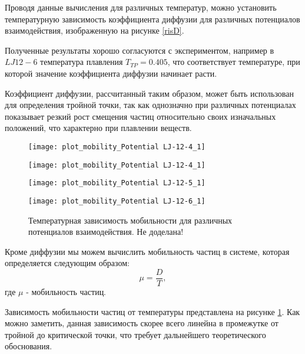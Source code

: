 Проводя данные вычисления для различных температур, можно установить температурную зависимость коэффициента диффузии для различных потенциалов взаимодействия, изображенную на рисунке \ref{risD}.

Полученные результаты хорошо согласуются с экспериментом, например в $LJ12-6$ температура плавления $T_{TP} = 0.405$, что соответствует температуре, при которой значение коэффициента диффузии начинает расти.

Коэффициент диффузии, рассчитанный таким образом, может быть использован для определения тройной точки, так как однозначно при различных потенциалах показывает резкий рост смещения частиц относительно своих изначальных положений, что характерно при плавлении веществ.

\begin{figure}[h]
\begin{center}
\begin{minipage}[h]{0.45\linewidth}
\texttt{[image: plot\_mobility\_Potential LJ-12-4\_1]}
\end{minipage}
\begin{minipage}[h]{0.45\linewidth}
\texttt{[image: plot\_mobility\_Potential LJ-12-4\_1]}
\end{minipage}
\begin{minipage}[h]{0.45\linewidth}
\texttt{[image: plot\_mobility\_Potential LJ-12-5\_1]}
\end{minipage}
\begin{minipage}[h]{0.45\linewidth}
\texttt{[image: plot\_mobility\_Potential LJ-12-6\_1]}
\end{minipage}
\caption{Температурная зависимость мобильности для различных потенциалов взаимодействия. Не доделана!}
\label{risMuDiff}
\end{center}
\end{figure}

Кроме диффузии мы можем вычислить мобильность частиц в системе, которая определяется следующим образом:
\begin{equation}
    \mu  = \frac{D}{T},
    \label{eqMuDiff}
\end{equation}
где $\mu$ - мобильность частиц.

Зависимость мобильности частиц от температуры представлена на рисунке \ref{risMuDiff}.
Как можно заметить, данная зависимость скорее всего линейна в промежутке от тройной до критической точки, что требует дальнейшего теоретического обоснования.

